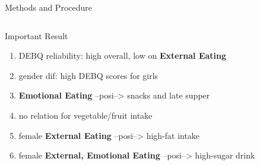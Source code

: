 \documentclass[final]{beamer}
\newlength{\onecolwid}
\newlength{\twocolwid}
\begin{document}
\begin{frame}[t]
\begin{columns}[t]
\begin{column}{\twocolwid}
\begin{columns}[t,totalwidth=\twocolwid]
\begin{column}{\onecolwid}
\begin{block}{Methods and Procedure}
\end{block}


\end{column} %

\end{columns} %



\begin{alertblock}{Important Result}

\begin{enumerate}
	\item DEBQ reliability: high overall, low on \textbf{External Eating}
	\item gender dif: high DEBQ scores for girls
	\item \textbf{Emotional Eating} --posi--> snacks and late supper
	\item no relation for vegetable/fruit intake
	\item female \textbf{External Eating} --posi--> high-fat intake
	\item female \textbf{External, Emotional Eating} --posi--> high-sugar drink
\end{enumerate}

\end{alertblock} 


\begin{columns}[t,totalwidth=\twocolwid] %

\begin{column}{\onecolwid} %



\end{column}
\end{columns}
\end{column}
\end{columns}
\end{frame}
\end{document}
